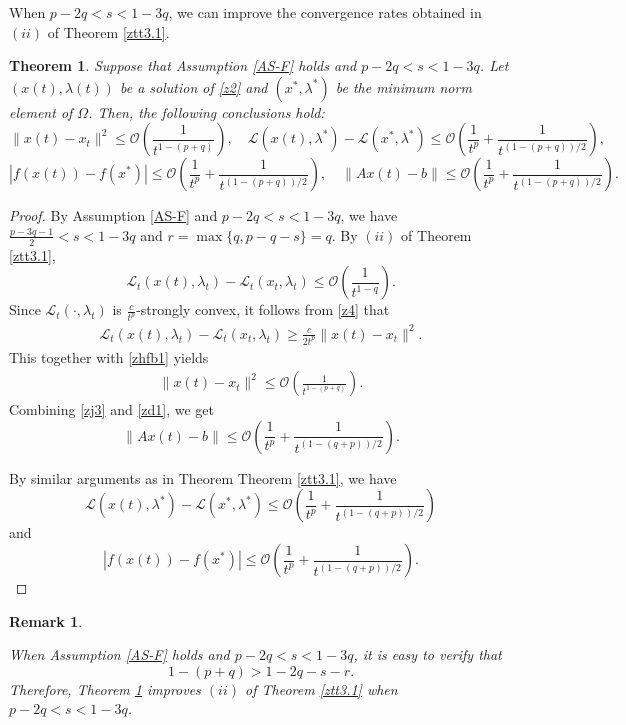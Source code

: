 \documentclass[review]{elsarticle}
\newtheorem{theorem}{Theorem}[section]
\newtheorem{remark}{Remark}[section]
\begin{document}
When  $p-2q<s<1-3q$, we can improve the convergence rates obtained in  $(ii)$ of Theorem \ref{ztt3.1}.
	\begin{theorem}\label{ztt3.3}
		Suppose that Assumption \ref{AS-F} holds and  $p-2q<s<1-3q$. Let $(x(t),\lambda(t))$ be a solution of \eqref{z2} and $(x^*,\lambda^*)$ be the minimum norm element of  $\Omega$. Then,  the following conclusions hold:
		$$\|x(t)-x_t\|^2\leq\mathcal{O}\left(\frac{1}{t^{1-(p+q)}}\right),\quad\mathcal{L}(x(t),\lambda^*)-\mathcal{L}(x^*,\lambda^*)\leq\mathcal{O}\left(\frac{1}{t^{p}}+\frac{1}{t^{(1-(p+q))/2}}\right),$$
		$$|f(x(t))-f(x^*)|\leq\mathcal{O}\left(\frac{1}{t^{p}}+\frac{1}{t^{(1-(p+q))/2}}\right), \quad \|Ax(t)-b\|\leq\mathcal{O}\left(\frac{1}{t^{p}}+\frac{1}{t^{(1-(p+q))/2}}\right).$$
	\end{theorem} 
	\begin{proof}
 By Assumption \ref{AS-F} and  $p-2q<s<1-3q$, we have $\frac{p-3q-1}{2}<s<1-3q$ and $r=\max\{q, p-q-s\}=q$. By $(ii)$ of Theorem \ref{ztt3.1},  
	\begin{equation}\label{zhfb1}
\mathcal{L}_{t}(x(t),\lambda_t)-\mathcal{L}_{t}(x_t,\lambda_t)\leq\mathcal{O}\left(\frac{1}{t^{1-q}}\right).
\end{equation}
	Since $\mathcal{L}_{t}(\cdot, \lambda_t)$ is $\frac{c}{t^p}$-strongly convex, it follows from \eqref{z4} that
	\begin{eqnarray*}
		\mathcal{L}_{t}(x(t),\lambda_t)-\mathcal{L}_{t}(x_t,\lambda_t)\geq\frac{c}{2t^p}\|x(t)-x_t\|^2.
	\end{eqnarray*}	
	This together with \eqref{zhfb1} yields 
	\begin{eqnarray}\label{zj3}
		\|x(t)-x_t\|^2\leq\mathcal{O}\left(\frac{1}{t^{1-(p+q)}}\right).
	\end{eqnarray}	
	Combining \eqref{zj3} and \eqref{zd1}, we get
	$$\|Ax(t)-b\|\leq\mathcal{O}\left(\frac{1}{t^p}+\frac{1}{t^{(1-(q+p))/2}}\right).$$

By similar arguments as in Theorem  Theorem \ref{ztt3.1}, we have
	$$\mathcal{L}(x(t),\lambda^*)-\mathcal{L}(x^*,\lambda^*)\leq\mathcal{O}\left(\frac{1}{t^p}+\frac{1}{t^{(1-(q+p))/2}}\right)$$
	and
	$$|f(x(t))-f(x^*)|\leq\mathcal{O}\left(\frac{1}{t^p}+\frac{1}{t^{(1-(q+p))/2}}\right).$$
	\end{proof}
	
	\begin{remark}\label{remark3}

When  Assumption \ref{AS-F} holds and  $p-2q<s<1-3q$,  it is easy to verify that 
$$1-(p+q)>1-2q-s-r.$$
Therefore,   Theorem \ref{ztt3.3}  improves  $(ii)$ of Theorem \ref{ztt3.1} when $p-2q<s<1-3q$.
	\end{remark}
	
\end{document}
